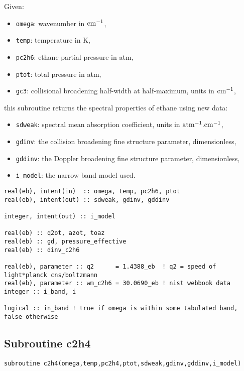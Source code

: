 Given:
\begin{itemize}
 \item \verb=omega=: wavenumber in $\rm cm^{-1}$,
 \item \verb=temp=: temperature in K,
 \item \verb=pc2h6=: ethane partial pressure in atm,
 \item \verb=ptot=: total pressure in atm,
 \item \verb=gc3=: collisional broadening half-width at half-maximum, units in $\rm cm^{-1}$,
\end{itemize}
this subroutine returns the spectral properties of ethane using new data:
\begin{itemize}
 \item \verb=sdweak=: spectral mean absorption coefficient, units in $\rm atm^{-1}.cm^{-1}$,
 \item \verb=gdinv=: the collision broadening fine structure parameter, dimensionless,
 \item \verb=gddinv=: the Doppler broadening fine structure parameter, dimensionless,
 \item \verb=i_model=: the narrow band model used.
\end{itemize}

\begin{lstlisting}
real(eb), intent(in)  :: omega, temp, pc2h6, ptot
real(eb), intent(out) :: sdweak, gdinv, gddinv

integer, intent(out) :: i_model

real(eb) :: q2ot, azot, toaz
real(eb) :: gd, pressure_effective
real(eb) :: dinv_c2h6

real(eb), parameter :: q2      = 1.4388_eb  ! q2 = speed of light*planck cns/boltzmann
real(eb), parameter :: wm_c2h6 = 30.0690_eb ! nist webbook data
integer :: i_band, i

logical :: in_band ! true if omega is within some tabulated band, false otherwise
\end{lstlisting}

\subsection{Subroutine c2h4}
\label{sub:c2h4}

\begin{lstlisting}
subroutine c2h4(omega,temp,pc2h4,ptot,sdweak,gdinv,gddinv,i_model)
\end{lstlisting}

